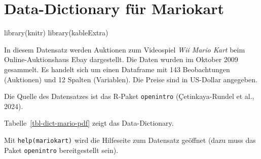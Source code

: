\documentclass[
  letterpaper,
  twoside,
  open=any]{scrbook}
\newenvironment{Shaded}{\begin{snugshade}}{\end{snugshade}}
\newcommand{\FunctionTok}[1]{\textcolor[rgb]{0.28,0.35,0.67}{#1}}
\newcommand{\NormalTok}[1]{\textcolor[rgb]{0.00,0.23,0.31}{#1}}
\theoremstyle{definition}
\theoremstyle{definition}
\theoremstyle{definition}
\theoremstyle{remark}
\begin{document}
\chapter{Data-Dictionary für Mariokart}\label{sec-data-dict}

\begin{Shaded}
\begin{Highlighting}[]
\FunctionTok{library}\NormalTok{(knitr)}
\FunctionTok{library}\NormalTok{(kableExtra)}
\end{Highlighting}
\end{Shaded}

In diesem Datensatz werden Auktionen zum Videospiel \emph{Wii Mario
Kart} beim Online-Auktionshaus Ebay dargestellt. Die Daten wurden im
Oktober 2009 gesammelt. Es handelt sich um einen Dataframe mit 143
Beobachtungen (Auktionen) und 12 Spalten (Variablen). Die Preise sind in
US-Dollar angegeben.

Die Quelle des Datensatzes ist das R-Paket \texttt{openintro}
(Çetinkaya-Rundel et al., 2024).

Tabelle~\ref{tbl-dict-mario-pdf} zeigt das Data-Dictionary.

\begin{table}

\caption{\label{tbl-dict-mario-pdf}Data-Dictionary für Mariokart}


\end{table}%

Mit \texttt{help(mariokart)} wird die Hilfeseite zum Datensatz geöffnet
(dazu muss das Paket \texttt{openintro} bereitgestellt sein).


\backmatter
\end{document}
